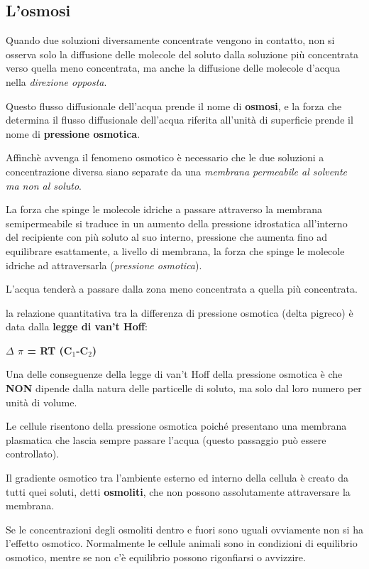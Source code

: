 \documentclass[]{article}
\begin{document}
\subsection{L'osmosi}\label{losmosi}

Quando due soluzioni diversamente concentrate vengono in contatto, non
si osserva solo la diffusione delle molecole del soluto dalla soluzione
più concentrata verso quella meno concentrata, ma anche la diffusione
delle molecole d'acqua nella \emph{direzione opposta}.

Questo flusso diffusionale dell'acqua prende il nome di \textbf{osmosi},
e la forza che determina il flusso diffusionale dell'acqua riferita
all'unità di superficie prende il nome di \textbf{pressione osmotica}.

Affinchè avvenga il fenomeno osmotico è necessario che le due soluzioni
a concentrazione diversa siano separate da una \emph{membrana permeabile
al solvente ma non al soluto}.

La forza che spinge le molecole idriche a passare attraverso la membrana
semipermeabile si traduce in un aumento della pressione idrostatica
all'interno del recipiente con più soluto al suo interno, pressione che
aumenta fino ad equilibrare esattamente, a livello di membrana, la forza
che spinge le molecole idriche ad attraversarla (\emph{pressione
osmotica}).

L'acqua tenderà a passare dalla zona meno concentrata a quella più
concentrata.

la relazione quantitativa tra la differenza di pressione osmotica (delta
pigreco) è data dalla \textbf{legge di van't Hoff}:

\textbf{\(\Delta\) \(\pi\) = RT (C\(_1\)-C\(_2\))}

Una delle conseguenze della legge di van't Hoff della pressione osmotica
è che \textbf{NON} dipende dalla natura delle particelle di soluto, ma
solo dal loro numero per unità di volume.

Le cellule risentono della pressione osmotica poiché presentano una
membrana plasmatica che lascia sempre passare l'acqua (questo passaggio
può essere controllato).

Il gradiente osmotico tra l'ambiente esterno ed interno della cellula è
creato da tutti quei soluti, detti \textbf{osmoliti}, che non possono
assolutamente attraversare la membrana.

Se le concentrazioni degli osmoliti dentro e fuori sono uguali
ovviamente non si ha l'effetto osmotico. Normalmente le cellule animali
sono in condizioni di equilibrio osmotico, mentre se non c'è equilibrio
possono rigonfiarsi o avvizzire.
\end{document}
